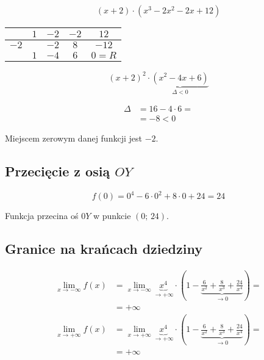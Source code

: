 \documentclass[a4paper,12pt]{article}
\begin{document}
\[ \left(x + 2 \right) \cdot \left( x^3 - 2x^2 - 2x + 12 \right) \]

\begin{center}
	\begin{tabular}{l|c|c|c|c|}

\cline{2-5}

                           & $1$ & $-2$ & $-2$ & $12$    \\ \hline

\multicolumn{1}{|l|}{$-2$} &     & $-2$ & $8$  & $-12$   \\ \hline

                           & $1$ & $-4$ & $6$  & $0 = R$ \\ \cline{2-5} 

\end{tabular}
\end{center}
\begin{minipage}[c]{0.7\textwidth}
	\[ \left(x + 2 \right)^2 \cdot \underbrace{\left( x^2 - 4x + 6 \right)}_{\Delta < 0} \]
\end{minipage}
\hspace{0.15cm} \vline \hspace{0.15cm}
\begin{minipage}[c]{0.2\textwidth}
	\begin{align*}
		\Delta &= 16 - 4 \cdot 6 = \\
		&= -8 < 0
	\end{align*}
\end{minipage}
\vspace{0.5cm}

Miejscem zerowym danej funkcji jest $-2$.

\subsection{Przecięcie z osią $OY$}

\[f \left( 0 \right) = 0^4  - 6\cdot 0^2 + 8\cdot 0 + 24 = 24 \]

Funkcja przecina oś $0Y$ w punkcie $ \left( 0; \, 24 \right)$.

\subsection{Granice na krańcach dziedziny}

\begin{align*}
	\lim\limits_{x \to - \infty} f \left( x \right) &=\lim\limits_{x \to - \infty} \underbrace{x^4}_{\to + \infty} \cdot \left( 1 - \underbrace{\frac{6}{x^2} + \frac{8}{x^3} + \frac{24}{x^4}}_{\to 0} \right) =\\
	&= + \infty \\
	\lim\limits_{x \to + \infty} f\left( x \right) &= \lim\limits_{x \to +\infty} \underbrace{x^4}_{\to + \infty} \cdot \left( 1 - \underbrace{\frac{6}{x^2} + \frac{8}{x^3} + \frac{24}{x^4}}_{\to 0} \right) = \\
	&= + \infty
\end{align*}
\end{document}
